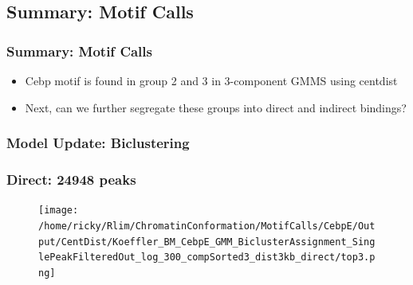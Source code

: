 \documentclass[notes]{beamer}
\begin{document}
\subsection{Summary: Motif Calls}
\begin{frame}
    \frametitle{Summary: Motif Calls}
    \begin{itemize}[<+->]
        \item Cebp motif is found in group 2 and 3 in 3-component GMMS using centdist
        \item Next, can we further segregate these groups into direct and indirect bindings?
    \end{itemize}
\end{frame} 

\subsubsection{Model Update: Biclustering}
{ %
    \begin{frame}[plain]
     \end{frame}
}

\begin{frame}[plain]
    \frametitle{Direct: 24948 peaks}
    \begin{figure}
        \texttt{[image: /home/ricky/Rlim/ChromatinConformation/MotifCalls/CebpE/Output/CentDist/Koeffler\_BM\_CebpE\_GMM\_BiclusterAssignment\_SinglePeakFilteredOut\_log\_300\_compSorted3\_dist3kb\_direct/top3.png]}
    \end{figure}
\end{frame}
\end{document}
